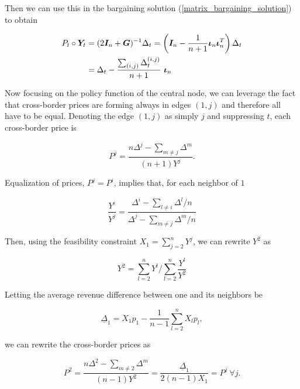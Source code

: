 Then we can use this in the bargaining solution (\ref{matrix_bargaining_solution}) to obtain

\begin{equation*}
  \begin{split}
    P_t \circ \Y_t &= (2\I_n + \G)^{-1} \Delta_t = \left( \I_n - \frac{1}{n + 1} \matr{\iota}_n \matr{\iota}_n^T \right) \Delta_t \\
    &= \Delta_t - \frac{\sum_{(i, j)} \Delta^{(i, j)}_t}{n+1} \ \matr{\iota}_n
  \end{split}
\end{equation*}

Now focusing on the policy function of the central node, we can leverage the fact that cross-border prices are forming always in edges $(1, j)$ and therefore all have to be equal. Denoting the edge $(1, j)$ as simply $j$ and suppressing $t$, each cross-border price is

\begin{equation*}
  P^j = \frac{n\Delta^j - \sum_{m \neq j} \Delta^m }{(n + 1)Y^j}.
\end{equation*}

Equalization of prices, $P^j = P^i$, implies that, for each neighbor of $1$

\begin{equation*}
  \frac{Y^i}{Y^j} = \frac{\Delta^i - \sum_{l \neq i} \Delta^l / n}{\Delta^j - \sum_{m \neq j} \Delta^m / n}
\end{equation*}

Then, using the feasibility constraint $X_1 = \sum^n_{j = 2} Y^j$, we can rewrite $Y^2$ as

\begin{equation*}
  Y^2 = \sum^n_{l = 2} Y^l \Big/ \sum^n_{l = 2} \frac{Y^l}{Y^2}
\end{equation*}

Letting the average revenue difference between one and its neighbors be

\begin{equation*}
  \underline{\Delta}_1 = X_1 p_1 - \frac{1}{n-1} \sum^n_{l = 2} X_l p_l,
\end{equation*}

we can rewrite the cross-border prices as

\begin{equation*}
  P^2 = \frac{n \Delta^2 - \sum_{m \neq 2} \Delta^m}{(n-1) Y^2} = \frac{\underline{\Delta}_1}{2 (n-1) X_1} = P^j \ \forall j.
\end{equation*}

